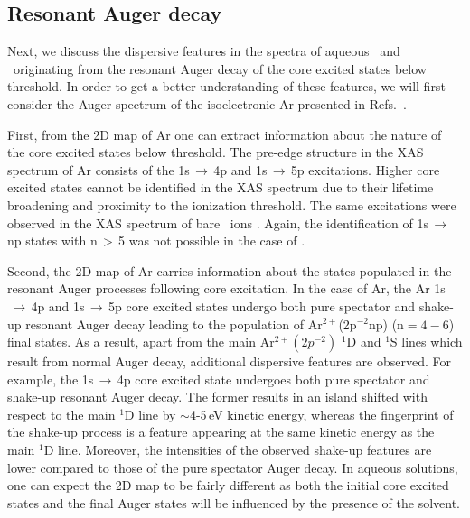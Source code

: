 \subsection{Resonant Auger decay} \label{ssec:ra}
Next, we discuss the dispersive features in the spectra of aqueous \ki~and \cli~originating from the resonant Auger decay of the core excited states below threshold. In order to get a better understanding of these features, we will first consider the Auger spectrum of the isoelectronic Ar presented in Refs.\ \citep{ceolin15:022502,guillemin15:012503}. 


First, from the 2D map of Ar one can extract information about the nature of the core excited states below threshold. The pre-edge structure in the XAS spectrum of Ar consists of the 1s$\,\rightarrow\,$4p and 1s$\,\rightarrow\,$5p excitations. Higher core excited states cannot be identified in the XAS spectrum due to their lifetime broadening and proximity to the ionization threshold. The same excitations were observed in the XAS spectrum of bare \ki~ions \citep{hertlein06:062715}. Again, the identification of 1s$\,\rightarrow\,$np states with n$\,>\,$5 was not possible in the case of \ki.


Second, the 2D map of Ar carries information about the states populated in the resonant Auger processes following core excitation. In the case of Ar, the Ar 1s$\,\rightarrow\,$4p and 1s$\,\rightarrow\,$5p core excited states undergo both pure spectator and shake-up resonant Auger decay leading to the population of Ar$^{2+}$(2p$^{-2}$np) (n$ = 4 - 6$) final states. As a result, apart from the main Ar$^{2+}(2p^{-2})$ $^1$D and $^1$S lines which result from normal Auger decay, additional dispersive features are observed. For example, the 1s$\,\rightarrow\,$4p core excited state undergoes both pure spectator and shake-up resonant Auger decay. The former results in an island shifted with respect to the main $^1$D line by $\sim$4-5\,eV kinetic energy, whereas the fingerprint of the shake-up process is a feature appearing at the same kinetic energy as the  main $^1$D line. Moreover, the intensities of the observed shake-up features are lower compared to those of the pure spectator Auger decay. In aqueous solutions, one can expect the 2D map to be fairly different as both the initial core excited states and the final Auger states will be influenced by the presence of the solvent.


